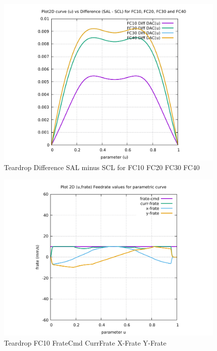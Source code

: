 \begin{figure}
	\caption     {Teardrop Difference SAL minus SCL for FC10 FC20 FC30 FC40}
	\label{26-img-Teardrop-Difference-SAL-minus-SCL-for-FC10-FC20-FC30-FC40.pdf}
	\includegraphics[width=1.00\textwidth]{Chap4/appendix/app-Teardrop/plots/26-img-Teardrop-Difference-SAL-minus-SCL-for-FC10-FC20-FC30-FC40.pdf}
\end{figure}


\clearpage
\pagebreak

\begin{figure}
	\caption     {Teardrop FC10 FrateCmd CurrFrate X-Frate Y-Frate}
	\label{27-img-Teardrop-FC10-FrateCmd-CurrFrate-X-Frate-Y-Frate.pdf}
	\includegraphics[width=1.00\textwidth]{Chap4/appendix/app-Teardrop/plots/27-img-Teardrop-FC10-FrateCmd-CurrFrate-X-Frate-Y-Frate.pdf}
\end{figure}


